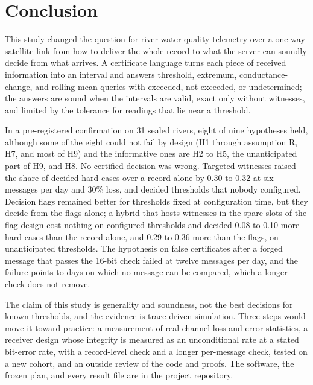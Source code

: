 \section{Conclusion}
\label{sec:conclusion}

This study changed the question for river water-quality telemetry over a one-way satellite link from how to deliver the whole record to what the server can soundly decide from what arrives. A certificate language turns each piece of received information into an interval and answers threshold, extremum, conductance-change, and rolling-mean queries with exceeded, not exceeded, or undetermined; the answers are sound when the intervals are valid, exact only without witnesses, and limited by the tolerance for readings that lie near a threshold.

In a pre-registered confirmation on 31 sealed rivers, eight of nine hypotheses held, although some of the eight could not fail by design (H1 through assumption R, H7, and most of H9) and the informative ones are H2 to H5, the unanticipated part of H9, and H8. No certified decision was wrong. Targeted witnesses raised the share of decided hard cases over a record alone by 0.30 to 0.32 at six messages per day and 30\% loss, and decided thresholds that nobody configured. Decision flags remained better for thresholds fixed at configuration time, but they decide from the flags alone; a hybrid that hosts witnesses in the spare slots of the flag design cost nothing on configured thresholds and decided 0.08 to 0.10 more hard cases than the record alone, and 0.29 to 0.36 more than the flags, on unanticipated thresholds. The hypothesis on false certificates after a forged message that passes the 16-bit check failed at twelve messages per day, and the failure points to days on which no message can be compared, which a longer check does not remove.

The claim of this study is generality and soundness, not the best decisions for known thresholds, and the evidence is trace-driven simulation. Three steps would move it toward practice: a measurement of real channel loss and error statistics, a receiver design whose integrity is measured as an unconditional rate at a stated bit-error rate, with a record-level check and a longer per-message check, tested on a new cohort, and an outside review of the code and proofs. The software, the frozen plan, and every result file are in the project repository.
